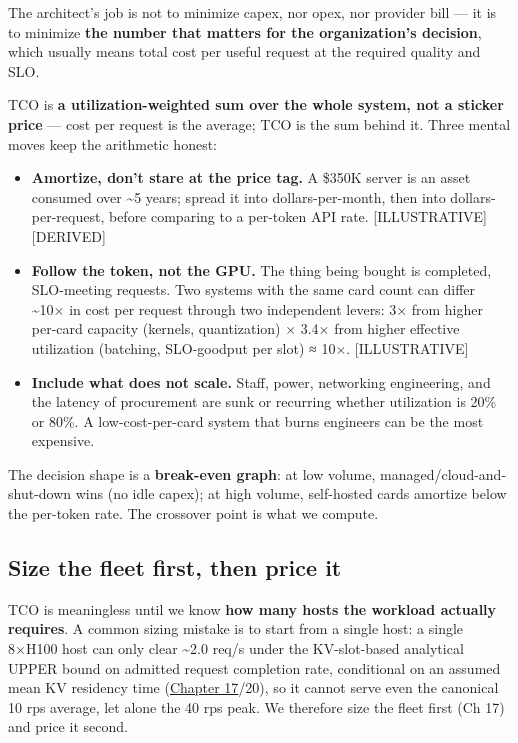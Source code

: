 The architect's job is not to minimize capex, nor opex, nor provider
bill --- it is to minimize \textbf{the number that matters for the
organization's decision}, which usually means total cost per useful
request at the required quality and SLO.

\label{mental-model}


TCO is \textbf{a utilization-weighted sum over the whole system, not a
sticker price} --- cost per request is the average; TCO is the sum
behind it. Three mental moves keep the arithmetic honest:

\begin{itemize}
\item
  \textbf{Amortize, don't stare at the price tag.} A \$350K server is an
  asset consumed over \textasciitilde5 years; spread it into
  dollars-per-month, then into dollars-per-request, before comparing to
  a per-token API rate. \mbox{{[}ILLUSTRATIVE{]}}\hspace{0pt}\mbox{{[}DERIVED{]}}
\item
  \textbf{Follow the token, not the GPU.} The thing being bought is
  completed, SLO-meeting requests. Two systems with the same card count
  can differ \textasciitilde10× in cost per request through two
  independent levers: 3× from higher per-card capacity (kernels,
  quantization) × 3.4× from higher effective utilization (batching,
  SLO-goodput per slot) ≈ 10×. \mbox{{[}ILLUSTRATIVE{]}}
\item
  \textbf{Include what does not scale.} Staff, power, networking
  engineering, and the latency of procurement are sunk or recurring
  whether utilization is 20\% or 80\%. A low-cost-per-card system that
  burns engineers can be the most expensive.
\end{itemize}

The decision shape is a \textbf{break-even graph}: at low volume,
managed/cloud-and-shut-down wins (no idle capex); at high volume,
self-hosted cards amortize below the per-token rate. The crossover point
is what we compute.

\label{worked-example}


\subsection{Size the fleet first, then price
it}\label{size-the-fleet-first-then-price-it}

TCO is meaningless until we know \textbf{how many hosts the workload
actually requires}. A common sizing mistake is to start from a single
host: a single 8×H100 host can only clear \textasciitilde2.0 req/s under
the KV-slot-based analytical UPPER bound on admitted request completion
rate, conditional on an assumed mean KV residency time (\hyperref[chap:17]{Chapter 17}/20),
so it cannot serve even the canonical 10 rps average, let alone the 40
rps peak. We therefore size the fleet first (Ch 17) and price it second.

